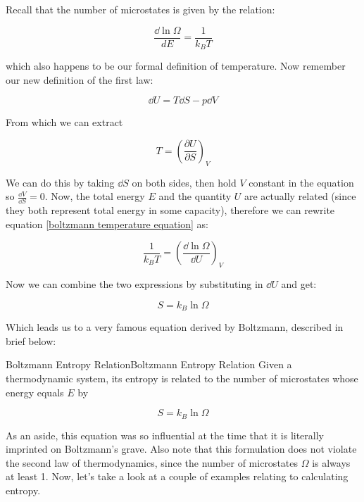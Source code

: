 Recall that the number of microstates is given by the relation:

\begin{equation}\label{boltzmann temperature equation}
    \frac{\dd \ln \Omega}{dE} = \frac{1}{k_BT}
\end{equation}

which also happens to be our formal definition of temperature. Now remember our new definition of the first law: 

\[ \dd U = T \dd S - p \dd V\] 

From which we can extract 

\[ T = \left(\frac{\partial U}{\partial S}\right)_V\] 

We can do this by taking $\dd S$ on both sides, then hold $V$ constant in the equation so $\frac{\dd V}{\dd S} = 0$. Now, the total energy $E$ and the quantity $U$ are actually related (since they both represent total energy in some capacity), therefore we can rewrite equation \ref{boltzmann temperature equation} as: 

\[ \frac{1}{k_BT} = \left(\frac{\dd \ln \Omega}{\dd U}\right)_V\] 

Now we can combine the two expressions by substituting in $\dd U$ and get:

\[ S = k_B \ln \Omega\] 

Which leads us to a very famous equation derived by Boltzmann, described in brief below: 

\begin{theorem}{Boltzmann Entropy Relation}{Boltzmann Entropy Relation}
    Given a thermodynamic system, its entropy is related to the number of microstates whose energy equals $E$ by 

    \[ S = k_B \ln \Omega\]
\end{theorem}

As an aside, this equation was so influential at the time that it is literally imprinted on Boltzmann's grave. Also note that this formulation does not violate the second law of thermodynamics, since the number of microstates $\Omega$ is always at least 1. Now, let's take a look at a couple of examples relating to calculating entropy. 

